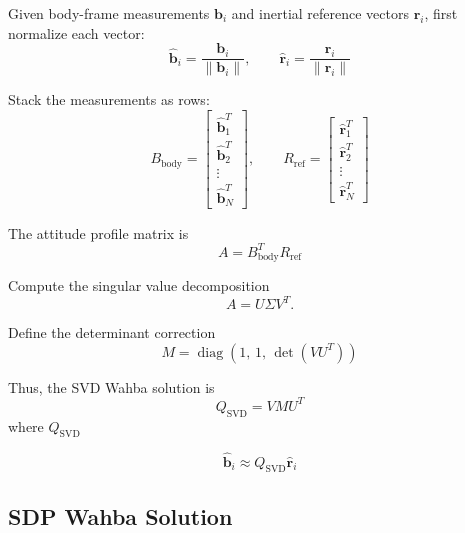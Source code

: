 \documentclass[conference,onecolumn,draftclsnofoot]{IEEEtran}
\begin{document}
Given body-frame measurements \(\mathbf b_i\) and inertial reference vectors
\(\mathbf r_i\), first normalize each vector:
\begin{equation}
\hat{\mathbf b}_i =
\frac{\mathbf b_i}{\|\mathbf b_i\|},
\qquad
\hat{\mathbf r}_i =
\frac{\mathbf r_i}{\|\mathbf r_i\|}
\end{equation}

Stack the measurements as rows:
\begin{equation}
B_{\mathrm{body}}
=
\begin{bmatrix}
\hat{\mathbf b}_1^T\\
\hat{\mathbf b}_2^T\\
\vdots\\
\hat{\mathbf b}_N^T
\end{bmatrix},
\qquad
R_{\mathrm{ref}}
=
\begin{bmatrix}
\hat{\mathbf r}_1^T\\
\hat{\mathbf r}_2^T\\
\vdots\\
\hat{\mathbf r}_N^T
\end{bmatrix}
\end{equation}

The attitude profile matrix is
\begin{equation}
A
=
B_{\mathrm{body}}^T R_{\mathrm{ref}}
\end{equation}

Compute the singular value decomposition
\begin{equation}
A
=
U\Sigma V^T.
\end{equation}

Define the determinant correction
\begin{equation}
M
=
\operatorname{diag}
\left(
1,\,
1,\,
\det(VU^T)
\right)
\end{equation}

Thus, the SVD Wahba solution is
\begin{equation}
\boxed{
Q_{\mathrm{SVD}}
=
V M U^T
}
\end{equation}
where \(Q_{\mathrm{SVD}}\) 

\begin{equation}
\hat{\mathbf b}_i
\approx
Q_{\mathrm{SVD}}\hat{\mathbf r}_i
\end{equation}

\subsection{SDP Wahba Solution}
\end{document}
